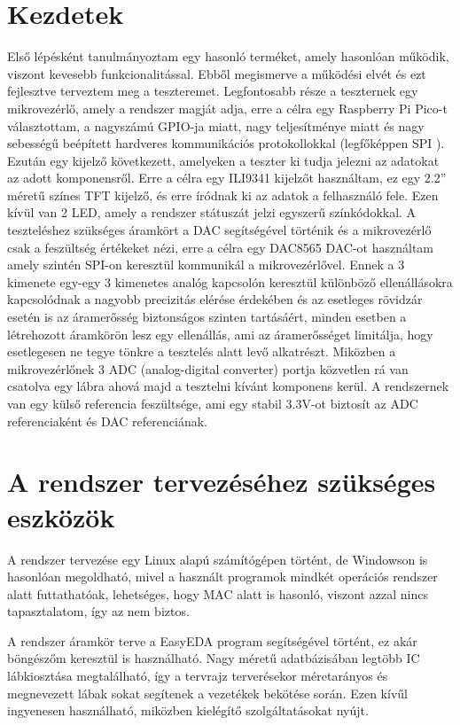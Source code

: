 \section{Kezdetek}

Első lépésként tanulmányoztam egy hasonló terméket, amely hasonlóan működik, 
viszont kevesebb funkcionalitással. Ebből megismerve a működési elvét és ezt fejlesztve 
terveztem meg a teszteremet. Legfontosabb része a teszternek egy mikrovezérlő, 
amely a rendszer magját adja, erre a célra egy Raspberry Pi Pico-t \cite{RaspberryPico} 
választottam, a nagyszámú GPIO-ja miatt, nagy teljesítménye miatt és nagy sebességű 
beépített hardveres kommunikációs protokollokkal (legfőképpen SPI \cite{SPIprotokol}). 
Ezután egy kijelző következett, amelyeken a teszter ki tudja jelezni az adatokat az adott 
komponensről. Erre a célra egy ILI9341 \cite{ILI9341Datasheet} kijelzőt használtam, ez 
egy 2.2” méretű színes TFT kijelző, és erre íródnak ki az adatok a felhasználó fele. 
Ezen kívül van 2 LED, amely a rendszer státuszát jelzi egyszerű színkódokkal. A teszteléshez 
szükséges áramkört a DAC segítségével történik és a mikrovezérlő csak a feszültség 
értékeket nézi, erre a célra egy DAC8565 \cite{DAC} DAC-ot használtam amely szintén 
SPI-on keresztül kommunikál a mikrovezérlővel. Ennek a 3 kimenete egy-egy 3 kimenetes 
analóg kapcsolón\cite{AnalogSwitch} keresztül különböző ellenállásokra kapcsolódnak a nagyobb precizitás 
elérése érdekében és az esetleges rövidzár esetén is az áramerősség biztonságos szinten 
tartásáért, minden esetben a létrehozott áramkörön lesz egy ellenállás, ami az 
áramerősséget limitálja, hogy esetlegesen ne tegye tönkre a tesztelés alatt levő 
alkatrészt. Miközben a mikrovezérlőnek 3 ADC (analog-digital converter) portja közvetlen 
rá van csatolva egy lábra ahová majd a tesztelni kívánt komponens kerül. A rendszernek 
van egy külső referencia feszültsége, ami egy stabil 3.3V-ot biztosít az ADC referenciaként 
és DAC referenciának.

\section{A rendszer tervezéséhez szükséges eszközök}

A rendszer tervezése egy Linux alapú számítógépen történt, de Windowson is hasonlóan
megoldható, mivel a használt programok mindkét operációs rendszer alatt futtathatóak,
lehetséges, hogy MAC alatt is hasonló, viszont azzal nincs tapasztalatom, így az nem biztos.

A rendszer áramkör terve a EasyEDA program segítségével történt, ez akár böngészőm keresztül is
használható. Nagy méretű adatbázisában legtöbb IC lábkiosztása megtalálható, így a 
tervrajz terverésekor méretarányos és megnevezett lábak sokat segítenek a vezetékek
bekötése során. Ezen kívűl ingyenesen használható, miközben kielégítő szolgáltatásokat nyújt.

